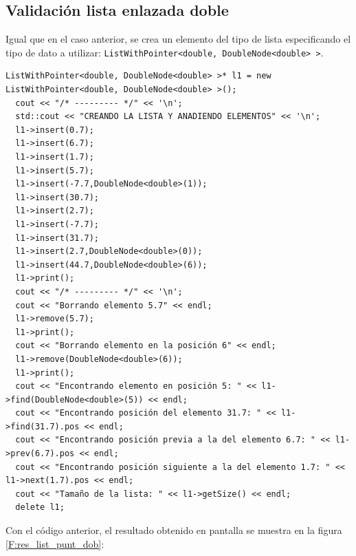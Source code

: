 \subsection{Validación lista enlazada doble}
Igual que en el caso anterior, se crea un elemento del tipo de lista especificando el tipo de dato a utilizar: \texttt{ListWithPointer<double, DoubleNode<double> >}. 


\begin{verbatim}
ListWithPointer<double, DoubleNode<double> >* l1 = new ListWithPointer<double, DoubleNode<double> >();
  cout << "/* --------- */" << '\n';
  std::cout << "CREANDO LA LISTA Y ANADIENDO ELEMENTOS" << '\n';
  l1->insert(0.7);
  l1->insert(6.7);
  l1->insert(1.7);
  l1->insert(5.7);
  l1->insert(-7.7,DoubleNode<double>(1));
  l1->insert(30.7);
  l1->insert(2.7);
  l1->insert(-7.7);
  l1->insert(31.7);
  l1->insert(2.7,DoubleNode<double>(0));
  l1->insert(44.7,DoubleNode<double>(6));
  l1->print();
  cout << "/* --------- */" << '\n';
  cout << "Borrando elemento 5.7" << endl;
  l1->remove(5.7);
  l1->print();
  cout << "Borrando elemento en la posición 6" << endl;
  l1->remove(DoubleNode<double>(6));
  l1->print();
  cout << "Encontrando elemento en posición 5: " << l1->find(DoubleNode<double>(5)) << endl;
  cout << "Encontrando posición del elemento 31.7: " << l1->find(31.7).pos << endl;
  cout << "Encontrando posición previa a la del elemento 6.7: " << l1->prev(6.7).pos << endl;
  cout << "Encontrando posición siguiente a la del elemento 1.7: " << l1->next(1.7).pos << endl;
  cout << "Tamaño de la lista: " << l1->getSize() << endl;
  delete l1;
\end{verbatim}

Con el código anterior, el resultado obtenido en pantalla se muestra en la figura \ref{F:res_list_punt_dob}:

